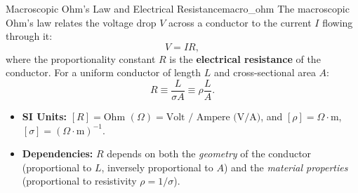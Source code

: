 \begin{definition}{Macroscopic Ohm's Law and Electrical Resistance}{macro_ohm}
The macroscopic Ohm's law relates the voltage drop $V$ across a conductor to the current $I$ flowing through it:
\begin{equation}
    V = I R,
\end{equation}
where the proportionality constant $R$ is the \textbf{electrical resistance} of the conductor. For a uniform conductor of length $L$ and cross-sectional area $A$:
\begin{equation}
    R \equiv \frac{L}{\sigma A} \equiv \rho \frac{L}{A}.
\end{equation}
\begin{itemize}
    \item \textbf{SI Units:} $[R] = \text{Ohm }(\Omega) = \text{Volt / Ampere (V/A)}$, and $[\rho] = \Omega \cdot \text{m}$, $[\sigma] = (\Omega \cdot \text{m})^{-1}$.
    \item \textbf{Dependencies:} $R$ depends on both the \emph{geometry} of the conductor (proportional to $L$, inversely proportional to $A$) and the \emph{material properties} (proportional to resistivity $\rho = 1/\sigma$).
\end{itemize}
\end{definition}

